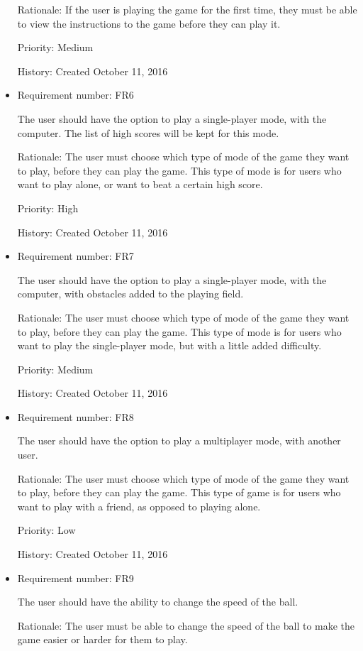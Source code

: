 \documentclass[12pt,letterpaper]{article}
\begin{document}
\begin{itemize}
		Rationale: If the user is playing the game for the first time, they must be able to view the instructions to the game before they can play it.

		Priority: Medium

		History: Created October 11, 2016

		\item Requirement number: FR6

		The user should have the option to play a single-player mode, with the computer. The list of high scores will be kept for this mode.

		Rationale: The user must choose which type of mode of the game they want to play, before they can play the game. This type of mode is for users who want to play alone, or want to beat a certain high score.

		Priority: High

		History: Created October 11, 2016

		\item Requirement number: FR7

		The user should have the option to play a single-player mode, with the computer, with obstacles added to the playing field. 

		Rationale: The user must choose which type of mode of the game they want to play, before they can play the game. This type of mode is for users who want to play the single-player mode, but with a little added difficulty.

		Priority: Medium

		History: Created October 11, 2016

		\item Requirement number: FR8

		The user should have the option to play a multiplayer mode, with another user.

		Rationale: The user must choose which type of mode of the game they want to play, before they can play the game. This type of game is for users who want to play with a friend, as opposed to playing alone.

		Priority: Low

		History: Created October 11, 2016

		\item Requirement number: FR9

		The user should have the ability to change the speed of the ball.

		Rationale: The user must be able to change the speed of the ball to make the game easier or harder for them to play.


\end{itemize}
\end{document}

